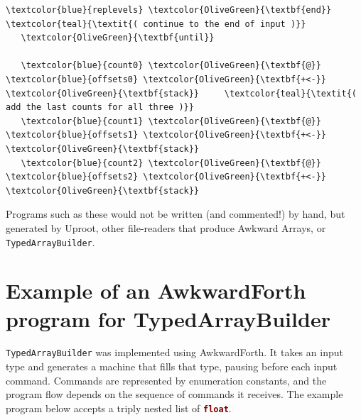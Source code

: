 \documentclass{webofc}
\begin{document}
\begin{Verbatim}[commandchars=\\\{\}]
     \textcolor{blue}{replevels} \textcolor{OliveGreen}{\textbf{end}}                 \textcolor{teal}{\textit{( continue to the end of input )}}
   \textcolor{OliveGreen}{\textbf{until}}

   \textcolor{blue}{count0} \textcolor{OliveGreen}{\textbf{@}} \textcolor{blue}{offsets0} \textcolor{OliveGreen}{\textbf{+<-}} \textcolor{OliveGreen}{\textbf{stack}}     \textcolor{teal}{\textit{( add the last counts for all three )}}
   \textcolor{blue}{count1} \textcolor{OliveGreen}{\textbf{@}} \textcolor{blue}{offsets1} \textcolor{OliveGreen}{\textbf{+<-}} \textcolor{OliveGreen}{\textbf{stack}}
   \textcolor{blue}{count2} \textcolor{OliveGreen}{\textbf{@}} \textcolor{blue}{offsets2} \textcolor{OliveGreen}{\textbf{+<-}} \textcolor{OliveGreen}{\textbf{stack}}
\end{Verbatim}
\normalsize

Programs such as these would not be written (and commented!) by hand, but generated by Uproot, other file-readers that produce Awkward Arrays, or {\tt TypedArrayBuilder}.

\section{Example of an AwkwardForth program for TypedArrayBuilder}

{\tt TypedArrayBuilder} was implemented using AwkwardForth. It takes an input type and generates a machine that fills that type, pausing before each input command. Commands are represented by enumeration constants, and the program flow depends on the sequence of commands it receives. The example program below accepts a triply nested list of \textcolor{Maroon}{\tt\textbf{float}}.
\end{document}
